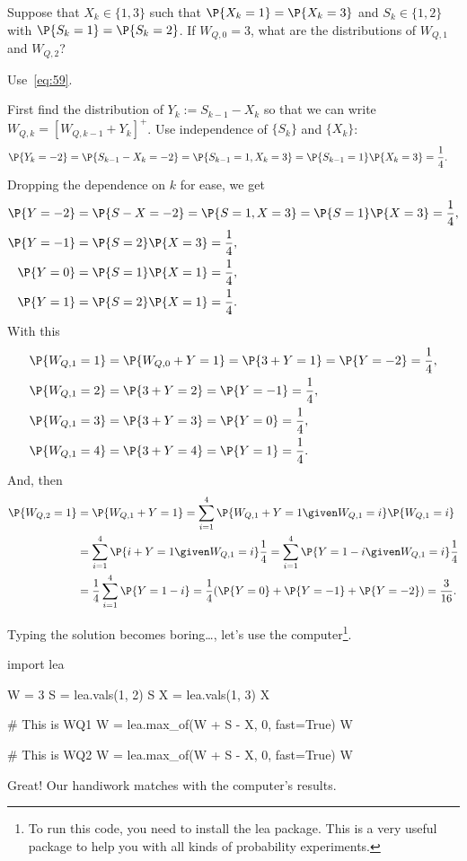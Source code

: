 \begin{extra}
 Suppose that $X_k\in\{1,3\}$ such that $\P{X_k=1}=\P{X_k=3}$ and
 $S_k\in\{1,2\}$ with $\P{S_k=1}=\P{S_k=2}$. If $W_{Q,0}=3$, what are
 the distributions of $W_{Q,1}$ and $W_{Q,2}$? 
\begin{hint}
Use~\cref{eq:59}.
\end{hint}
\begin{solution} First find the distribution of $Y_k:=S_{k-1}-X_k$ so that we can write
 $W_{Q,k}=[W_{Q,k-1}+Y_k]^+$. Use independence of $\{S_k\}$ and $\{X_k\}$:
\begin{align*}
 \P{Y_k=-2} &=\P{S_{k-1}-X_k=-2} = \P{S_{k-1}=1, X_k=3} = \P{S_{k-1}=1}\P{X_k=3} = \frac14.
\end{align*}
Dropping the dependence on $k$ for ease, we get
\begin{align*}
 \P{Y=-2} &=\P{S-X=-2} = \P{S=1, X=3} = \P{S=1}\P{X=3} = \frac14,\\
 \P{Y=-1} &=\P{S=2}\P{X=3} = \frac14,\\
 \P{Y=0} &=\P{S=1}\P{X=1} = \frac14,\\
 \P{Y=1} &=\P{S=2}\P{X=1} = \frac14.
\end{align*}
With this
 \begin{align*}
 \P{W_{Q,1} = 1} &=\P{W_{Q,0} + Y= 1} = \P{3 + Y =1} = \P{Y=-2} =\frac14,\\
 \P{W_{Q,1} = 2} &= \P{3 + Y =2} = \P{Y=-1} =\frac14,\\
 \P{W_{Q,1} = 3} &= \P{3 + Y = 3} = \P{Y=0} =\frac14,\\
 \P{W_{Q,1} = 4} &= \P{3 + Y = 4} = \P{Y=1} =\frac14.\\
 \end{align*}
And, then
 \begin{equation*}
 \begin{split}
 \P{W_{Q,2} = 1} 
&=\P{W_{Q,1} + Y = 1} = \sum_{i=1}^4 \P{W_{Q,1} + Y = 1\given W_{Q,1}=i}\P{W_{Q,1}=i}\\
&=\sum_{i=1}^4 \P{i + Y = 1\given W_{Q,1}=i}\frac14
=\sum_{i=1}^4 \P{Y = 1-i\given W_{Q,1}=i}\frac14\\
&=\frac14\sum_{i=1}^4 \P{Y = 1-i} = \frac14(\P{Y = 0} + \P{Y=-1} +\P{Y=-2}) = \frac{3}{16}.
 \end{split}
 \end{equation*}

Typing the solution becomes boring\ldots, let's use the computer\footnote{To run this code, you need to install the lea package. This is a very useful package to help you with all kinds of probability experiments.}.

\begin{pyconsole}
import lea

W = 3
S = lea.vals(1, 2)
S
X = lea.vals(1, 3)
X

# This is WQ1
W = lea.max_of(W + S - X, 0, fast=True)
W

# This is WQ2
W = lea.max_of(W + S - X, 0, fast=True)
W
\end{pyconsole}
Great! Our handiwork matches with the computer's results. 

\end{solution}
\end{extra}



